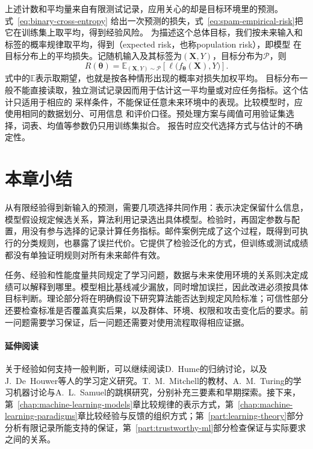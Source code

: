上述计数和平均量来自有限测试记录，应用关心的却是目标环境里的预测。式~\eqref{eq:binary-cross-entropy}
给出一次预测的损失，式~\eqref{eq:spam-empirical-risk}把它在训练集上取平均，得到经验风险。
为描述这个总体目标，我们按未来输入和标签的概率规律取平均，得到（expected risk，也称population
risk），即模型
在目标分布上的平均损失。记随机输入及其标签为$(\bm{X},Y)$，目标分布为$\mathcal{P}$，则
\begin{equation}
  R(\bm{\theta})
  =\mathbb{E}_{(\bm{X},Y)\sim\mathcal{P}}
  \left[\ell\bigl(f_{\bm{\theta}}(\bm{X}),Y\bigr)\right].
  \label{eq:expected-risk}
\end{equation}
式中的$\mathbb{E}$表示取期望，也就是按各种情形出现的概率对损失加权平均。
目标分布一般不能直接读取，独立测试记录因而用于估计这一平均量或对应任务指标。这个估计只适用于相应的
采样条件，不能保证任意未来环境中的表现。比较模型时，应使用相同的数据划分、可用信息
和评价口径。预处理方案与阈值可用验证集选择，词表、均值等参数仍只用训练集拟合。
报告时应交代选择方式与估计的不确定性。

\section{本章小结}
\label{sec:introduction-summary}

从有限经验得到新输入的预测，需要几项选择共同作用：表示决定保留什么信息，模型假设规定候选关系，算法利用记录选出具体模型。检验时，再固定参数与配置，用没有参与选择的记录计算任务指标。邮件案例完成了这个过程，既得到可执行的分类规则，也暴露了误拦代价。它提供了检验泛化的方式，但训练或测试成绩都没有单独证明规则对所有未来邮件有效。

任务、经验和性能度量共同规定了学习问题，数据与未来使用环境的关系则决定成绩可以解释到哪里。模型相比基线减少漏放，同时增加误拦，因此改进必须按具体目标判断。理论部分将在明确假设下研究算法能否达到规定风险标准；可信性部分还要检查标准是否覆盖真实后果，以及群体、环境、权限和攻击变化后的要求。前一问题需要学习保证，后一问题还需要对使用流程取得相应证据。

\paragraph{延伸阅读}

关于经验如何支持一般判断，可以继续阅读D.~Hume的归纳讨论，以及J.~De~Houwer等人的学习定义研究。T.~M.~Mitchell的教材、A.~M.~Turing的学习机器讨论与A.~L.~Samuel的跳棋研究，分别补充三要素和早期探索。接下来，第~\ref{chap:machine-learning-models}章比较规律的表示方式，第~\ref{chap:machine-learning-paradigms}章比较经验与反馈的组织方式；第~\ref{part:learning-theory}部分分析有限记录所能支持的保证，第~\ref{part:trustworthy-ml}部分检查保证与实际要求之间的关系。